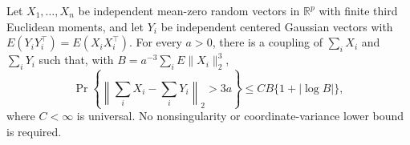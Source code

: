 Let \(X_1,\ldots,X_n\) be independent mean-zero random vectors in \(\mathbb R^p\) with finite third Euclidean moments, and let \(Y_i\) be independent centered Gaussian vectors with \(E(Y_iY_i^\top)=E(X_iX_i^\top)\). For every \(a>0\), there is a coupling of \(\sum_iX_i\) and \(\sum_iY_i\) such that, with \(B=a^{-3}\sum_iE\|X_i\|_2^3\),
\[
 \Pr\left\{\left\|\sum_iX_i-\sum_iY_i\right\|_2>3a\right\}
 \le C B\{1+|\log B|\},
\]
where \(C<\infty\) is universal. No nonsingularity or coordinate-variance lower bound is required.